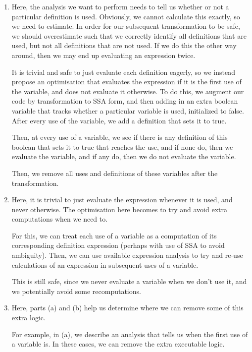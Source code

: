 


\begin{enumerate}[label=(\alph*)]
  \item
    Here, the analysis we want to perform needs to tell us whether or not a particular definition is used. Obviously, we cannot calculate this exactly, so we need to estimate. In order for our subsequent transformation to be safe, we should overestimate such that we correctly identify all definitions that are used, but not all definitions that are not used. If we do this the other way around, then we may end up evaluating an expression twice.

    It is trivial and safe to just evaluate each definition eagerly, so we instead propose an optimisation that evaluates the expression if it is the first use of the variable, and does not evaluate it otherwise. To do this, we augment our code by transformation to SSA form, and then adding in an extra boolean variable that tracks whether a particular variable is used, initialized to false. After every use of the variable, we add a definition that sets it to true.

    Then, at every use of a variable, we see if there is any definition of this boolean that sets it to true that reaches the use, and if none do, then we evaluate the variable, and if any do, then we do not evaluate the variable.

    Then, we remove all uses and definitions of these variables after the transformation.

  \item
    Here, it is trivial to just evaluate the expression whenever it is used, and never otherwise. The optimisation here becomes to try and avoid extra computations when we need to.

    For this, we can treat each use of a variable as a computation of its corresponding definition expression (perhaps with use of SSA to avoid ambiguity). Then, we can use available expression analysis to try and re-use calculations of an expression in subsequent uses of a variable.

    This is still safe, since we never evaluate a variable when we don't use it, and we potentially avoid some recomputations.

  \item
    Here, parts (a) and (b) help us determine where we can remove some of this extra logic.

    For example, in (a), we describe an analysis that tells us when the first use of a variable is. In these cases, we can remove the extra executable logic.


\end{enumerate}
